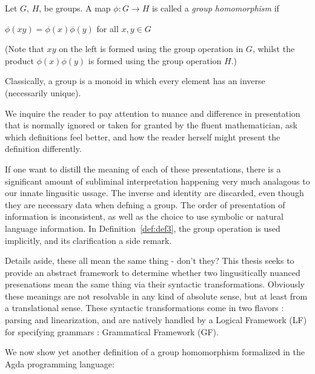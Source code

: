 
\begin{definition}\label{def:def3}
Let $G$, $H$, be groups.  A map $\phi : G \to H$ is called a \emph{group homomorphism} if
\begin{center}
  $\phi(xy) = \phi ( x ) \phi ( y )$ for all $x, y \in G$ 
\end{center}
(Note that $xy$ on the left is formed using the group operation in $G$, whilst the product $\phi ( x ) \phi ( y )$ is formed using the group operation $H$.)
\end{definition}


\begin{definition}\label{def:def4}
Classically, a group is a monoid in which every element has an inverse (necessarily unique).
\end{definition}

We inquire the reader to pay attention to nuance and difference in presentation
that is normally ignored or taken for granted by the fluent mathematician, ask
which definitions feel better, and how the reader herself might present the
definition differently.

If one want to distill the meaning of each of these presentations, there is a
significant amount of subliminal interpretation happening very much analagous to
our innate lingusitic ussage. The inverse and identity are discarded, even
though they are necessary data when defning a group. The order of presentation
of information is inconsistent, as well as the choice to use symbolic or natural
language information. In Definition~\ref{def:def3}, the group operation is used
implicitly, and its clarification a side remark.

Details aside, these all mean the same thing - don't they?  This thesis seeks to provide an
abstract framework to determine whether two lingusitically nuanced presenations
mean the same thing via their syntactic transformations. Obviously these
meanings  are not resolvable in any kind of absolute sense, but at least from a
translational sense. These syntactic transformations come in two flavors : parsing and
linearization, and are natively handled by a Logical Framework (LF) for
specifying grammars : Grammatical Framework (GF).

We now show yet another definition of a group homomorphism formalized in the
Agda programming language:




